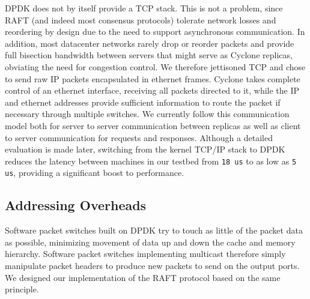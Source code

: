 \documentclass[letterpaper,twocolumn,10pt]{article}
\begin{document}
DPDK does not by itself provide a TCP stack. This is not a problem,
since RAFT (and indeed most consensus protocols) tolerate network
losses and reordering by design due to the need to support
asynchronous communication. In addition, most datacenter networks
rarely drop or reorder packets and provide full bisection bandwidth
between servers that might serve as Cyclone replicas, obviating the
need for congestion control. We therefore jettisoned TCP and chose to
send raw IP packets encapsulated in ethernet frames. Cyclone takes
complete control of an ethernet interface, receiving all packets
directed to it, while the IP and ethernet addresses provide sufficient
information to route the packet if necessary through multiple
switches. We currently follow this communication model both for server
to server communication between replicas as well as client to server
communication for requests and responses. Although a detailed
evaluation is made later, switching from the kernel TCP/IP stack to
DPDK reduces the latency between machines in our testbed from {\tt 18
  us} to as low as {\tt 5 us}, providing a significant boost to
performance.

\subsection{Addressing Overheads}
\label{sec:dm}
Software packet switches built on DPDK try to touch as little of the packet data
as possible, minimizing movement of data up and down the cache and memory
hierarchy. Software packet switches implementing multicast therefore
simply manipulate packet headers to produce new packets to send on the output
ports. We designed our implementation of the RAFT protocol based on the same
principle.
\end{document}
